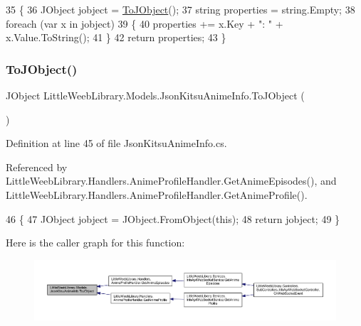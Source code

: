 \begin{DoxyCode}
35         \{
36             JObject jobject = \mbox{\hyperlink{class_little_weeb_library_1_1_models_1_1_json_kitsu_anime_info_a2c92ffb7d523c4f75497988156b64b7b}{ToJObject}}();
37             \textcolor{keywordtype}{string} properties = \textcolor{keywordtype}{string}.Empty;
38             \textcolor{keywordflow}{foreach} (var x \textcolor{keywordflow}{in} jobject)
39             \{
40                 properties += x.Key + \textcolor{stringliteral}{": "} + x.Value.ToString();
41             \}
42             \textcolor{keywordflow}{return} properties;
43         \}
\end{DoxyCode}
\mbox{\label{class_little_weeb_library_1_1_models_1_1_json_kitsu_anime_info_a2c92ffb7d523c4f75497988156b64b7b}} 
\subsubsection{\texorpdfstring{To\+J\+Object()}{ToJObject()}}
{\footnotesize\ttfamily J\+Object Little\+Weeb\+Library.\+Models.\+Json\+Kitsu\+Anime\+Info.\+To\+J\+Object (\begin{DoxyParamCaption}{ }\end{DoxyParamCaption})}



Definition at line 45 of file Json\+Kitsu\+Anime\+Info.\+cs.



Referenced by Little\+Weeb\+Library.\+Handlers.\+Anime\+Profile\+Handler.\+Get\+Anime\+Episodes(), and Little\+Weeb\+Library.\+Handlers.\+Anime\+Profile\+Handler.\+Get\+Anime\+Profile().


\begin{DoxyCode}
46         \{
47             JObject jobject = JObject.FromObject(\textcolor{keyword}{this});
48             \textcolor{keywordflow}{return} jobject;
49         \}
\end{DoxyCode}
Here is the caller graph for this function\+:\nopagebreak
\begin{figure}[H]
\begin{center}
\leavevmode
\includegraphics[width=350pt]{class_little_weeb_library_1_1_models_1_1_json_kitsu_anime_info_a2c92ffb7d523c4f75497988156b64b7b_icgraph}
\end{center}
\end{figure}



